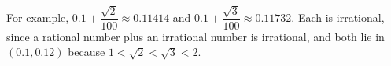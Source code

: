 For example, $0.1+\dfrac{\sqrt2}{100}\approx0.11414$ and $0.1+\dfrac{\sqrt3}{100}\approx0.11732$. Each is irrational, since a rational number plus an irrational number is irrational, and both lie in $(0.1,0.12)$ because $1<\sqrt2<\sqrt3<2$.
